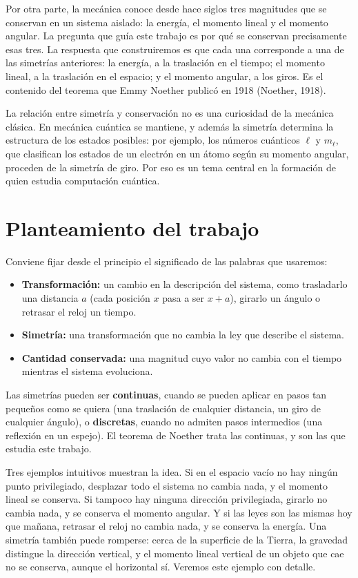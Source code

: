 \documentclass[11pt,a4paper,spanish]{book}
\providecommand{\tightlist}{%
  \setlength{\itemsep}{0pt}\setlength{\parskip}{0pt}}
\begin{document}
Por otra parte, la mecánica conoce desde hace siglos tres magnitudes que
se conservan en un sistema aislado: la energía, el momento lineal y el
momento angular. La pregunta que guía este trabajo es por qué se
conservan precisamente esas tres. La respuesta que construiremos es que
cada una corresponde a una de las simetrías anteriores: la energía, a la
traslación en el tiempo; el momento lineal, a la traslación en el
espacio; y el momento angular, a los giros. Es el contenido del teorema
que Emmy Noether publicó en 1918 (Noether, 1918).

La relación entre simetría y conservación no es una curiosidad de la
mecánica clásica. En mecánica cuántica se mantiene, y además la simetría
determina la estructura de los estados posibles: por ejemplo, los
números cuánticos \(\ell\) y \(m_\ell\), que clasifican los estados de
un electrón en un átomo según su momento angular, proceden de la
simetría de giro. Por eso es un tema central en la formación de quien
estudia computación cuántica.

\section{Planteamiento del trabajo}\label{planteamiento-del-trabajo}

Conviene fijar desde el principio el significado de las palabras que
usaremos:

\begin{itemize}
\tightlist
\item
  \textbf{Transformación:} un cambio en la descripción del sistema, como
  trasladarlo una distancia \(a\) (cada posición \(x\) pasa a ser
  \(x + a\)), girarlo un ángulo o retrasar el reloj un tiempo.
\item
  \textbf{Simetría:} una transformación que no cambia la ley que
  describe el sistema.
\item
  \textbf{Cantidad conservada:} una magnitud cuyo valor no cambia con el
  tiempo mientras el sistema evoluciona.
\end{itemize}

Las simetrías pueden ser \textbf{continuas}, cuando se pueden aplicar en
pasos tan pequeños como se quiera (una traslación de cualquier
distancia, un giro de cualquier ángulo), o \textbf{discretas}, cuando no
admiten pasos intermedios (una reflexión en un espejo). El teorema de
Noether trata las continuas, y son las que estudia este trabajo.

Tres ejemplos intuitivos muestran la idea. Si en el espacio vacío no hay
ningún punto privilegiado, desplazar todo el sistema no cambia nada, y
el momento lineal se conserva. Si tampoco hay ninguna dirección
privilegiada, girarlo no cambia nada, y se conserva el momento angular.
Y si las leyes son las mismas hoy que mañana, retrasar el reloj no
cambia nada, y se conserva la energía. Una simetría también puede
romperse: cerca de la superficie de la Tierra, la gravedad distingue la
dirección vertical, y el momento lineal vertical de un objeto que cae no
se conserva, aunque el horizontal sí. Veremos este ejemplo con detalle.
\end{document}
